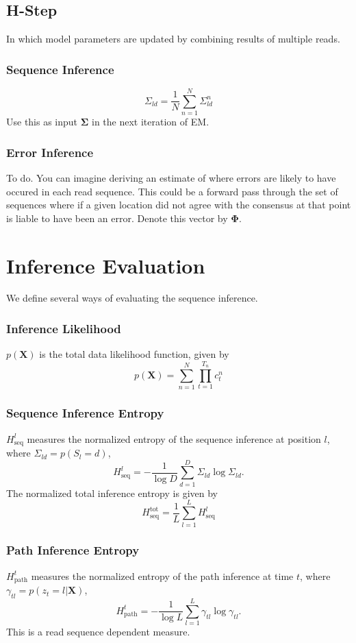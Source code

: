 \documentclass[reqno]{amsart}
\numberwithin{equation}{section}
\begin{document}
\subsection{H-Step}
In which model parameters are updated by combining results of multiple reads.

\subsubsection{Sequence Inference}
\begin{equation}
\Sigma_{ld} = \frac{1}{N}\displaystyle\sum_{n=1}^{N} \Sigma_{ld}^{n}
\end{equation}
Use this as input $\mathbf{\Sigma}$ in the next iteration of EM.

\subsubsection{Error Inference}
To do. You can imagine deriving an estimate of where errors are likely to have occured in each read sequence. This could be a forward pass through the set of sequences where if a given location did not agree with the consensus at that point is liable to have been an error. Denote this vector by $\mathbf{\Phi}$.

\section{Inference Evaluation}
We define several ways of evaluating the sequence inference.
\subsubsection{Inference Likelihood}
$p(\mathbf{X})$ is the total data likelihood function, given by
\begin{equation}
p(\mathbf{X}) = \displaystyle\sum_{n=1}^N\displaystyle\prod_{t=1}^{T_n} c_{t}^n
\end{equation}
\subsubsection{Sequence Inference Entropy}
$H_\mathrm{seq}^l$ measures the normalized entropy of the sequence inference at position $l$, where $\Sigma_{ld} = p(S_l = d)$,
\begin{equation}
H_\mathrm{seq}^l = -\frac{1}{\log{D}}\displaystyle\sum_{d=1}^{D} \Sigma_{ld}\log{\Sigma_{ld}}.
\end{equation}
The normalized total inference entropy is given by
\begin{equation}
H_{\mathrm{seq}}^{\mathrm{tot}} = \frac{1}{L}\displaystyle\sum_{l=1}^{L} H_\mathrm{seq}^l
\end{equation}
\subsubsection{Path Inference Entropy}
$H_\mathrm{path}^t$ measures the normalized entropy of the path inference at time $t$, where $\gamma_{tl} = p(z_t=l|\mathbf{X})$,
\begin{equation}
H_\mathrm{path}^t = -\frac{1}{\log L}\displaystyle\sum_{l=1}^{L} \gamma_{tl}\log\gamma_{tl}.
\end{equation}
This is a read sequence dependent measure.
\end{document}
